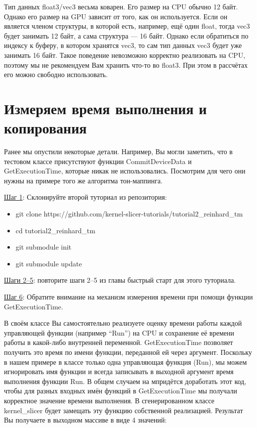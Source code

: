 \documentclass[11pt,fleqn,english,russian]{report} %
\begin{document}
\begin{remark}
Тип данных float3/vec3 весьма коварен. Его размер на CPU обычно 12 байт. Однако его размер на GPU зависит от того, как он используется. Если он является членом структуры, в которой есть, например, ещё один float, тогда vec3 будет занимать 12 байт, а сама структура --- 16 байт. Однако если обратиться по индексу к буферу, в котором хранятся vec3, то сам тип данных vec3 будет уже занимать 16 байт. Такое поведение невозможно корректно реализовать на CPU, поэтому мы не рекомендуем Вам хранить что-то во float3. При этом в рассчётах его можно свободно использовать.
\end{remark}	

\section{Измеряем время выполнения и копирования}

Ранее мы опустили некоторые детали. Например, Вы могли заметить, что в тестовом классе присутствуют функции CommitDeviceData и GetExecutionTime, которые никак не использовались. Посмотрим для чего они нужны на примере того же алгоритма тон-маппинга.

\noindent\underline{Шаг 1}: Склонируйте второй туториал из репозитория:

\begin{itemize}
	\item git clone https://github.com/kernel-slicer-tutorials/tutorial2\_reinhard\_tm
	\item cd tutorial2\_reinhard\_tm
	\item git submodule init
	\item git submodule update
\end{itemize}

\vspace*{5px}
\noindent\underline{Шаги 2--5}: повторите шаги 2--5 из главы быстрый старт для этого туториала. 

\vspace*{5px}
\noindent\underline{Шаг 6}: Обратите внимание на механизм измерения времени при помощи функции GetExecutionTime. 

В своём классе Вы самостоятельно реализуете оценку времени работы каждой управляющей функции (например ``Run'') на CPU и сохранение её времени работы в какой-либо внутренней переменной. GetExecutionTime позволяет получить это время по имени функции, переданной ей через аргумент. Поскольку в нашем примере в классе только одна управляющая функция (Run), мы можем игнорировать имя функции и всегда записывать в выходной аргумент время выполнения функции Run. В общем случаем на мпридётся доработать этот код, чтобы для разных входных имён функций в GetExecutionTime мы получали корректное значение времени выполнения. В сгенерированном классе kernel\_slicer будет замещать эту функцию собственной реализацией. Результат Вы получаете в выходном массиве в виде 4 значений: 
\end{document}
